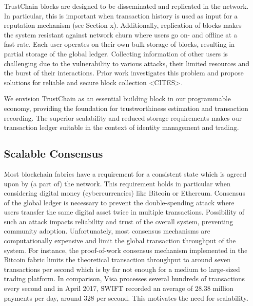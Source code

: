 \documentclass[USenglish]{article}
\begin{document}
TrustChain blocks are designed to be disseminated and replicated in the network.
In particular, this is important when transaction history is used as input for a reputation mechanism (see Section x).
Additionally, replication of blocks makes the system resistant against network churn where users go on- and offline at a fast rate.
Each user operates on their own bulk storage of blocks, resulting in partial storage of the global ledger.
Collecting information of other users is challenging due to the vulnerability to various attacks, their limited resources and the burst of their interactions.
Prior work investigates this problem and propose solutions for reliable and secure block collection <CITES>.

We envision TrustChain as an essential building block in our programmable economy, providing the foundation for trustworthiness estimation and transaction recording.
The superior scalability and reduced storage requirements makes our transaction ledger suitable in the context of identity management and trading.

\subsection{Scalable Consensus}

Most blockchain fabrics have a requirement for a consistent state which is agreed upon by (a part of) the network.
This requirement holds in particular when considering digital money (cybercurrencies) like Bitcoin or Ethereum.
Consensus of the global ledger is necessary to prevent the double-spending attack where users transfer the same digital asset twice in multiple transactions.
Possibility of such an attack impacts reliability and trust of the overall system, preventing community adoption.
Unfortunately, most consensus mechanisms are computationally expensive and limit the global transaction throughput of the system.
For instance, the proof-of-work consensus mechanism implemented in the Bitcoin fabric limits the theoretical transaction throughput to around seven transactions per second which is by far not enough for a medium to large-sized trading platform.
In comparison, Visa processes several hundreds of transactions every second and in April 2017, SWIFT recorded an average of 28.38 million payments per day, around 328 per second.
This motivates the need for scalability.
\end{document}
